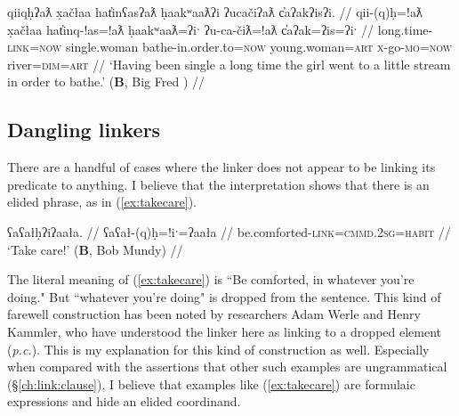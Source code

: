 \ex \label{ex:longtimesingle}
\begingl
\glpreamble qiiqḥʔaƛ x̣ačłaa hat̓inʕasʔaƛ ḥaakʷaaƛʔi ʔucačiʔaƛ c̓aʔakʔisʔi. //
\gla qii-(q)ḥ=!aƛ x̣ačłaa hat̓inq-!as=!aƛ ḥaakʷaaƛ=ʔiˑ ʔu-ca-čiƛ=!aƛ c̓aʔak=ʔis=ʔiˑ //
\glb long.time-\textsc{link}=\textsc{now} single.woman bathe-in.order.to=\textsc{now} young.woman=\textsc{art} \textsc{x}-go-\textsc{mo}=\textsc{now} river=\textsc{dim}=\textsc{art} //
\glft `Having been single a long time the girl went to a little stream in order to bathe.' (\textbf{B}, Big Fred \citealt[p.~68]{sapir1939}) //
\endgl
\xe



\subsection{Dangling linkers} \label{ch:link:dangling}

There are a handful of cases where the linker does not appear to be linking its predicate to anything. I believe that the interpretation shows that there is an elided phrase, as in (\ref{ex:takecare}).

\ex \label{ex:takecare}
\begingl
\glpreamble ʕaʕałḥʔiʔaała. //
\gla ʕaʕał-(q)ḥ=!iˑ=ʔaała //
\glb be.comforted-\textsc{link}=\textsc{cmmd.2sg}=\textsc{habit} //
\glft `Take care!' (\textbf{B}, Bob Mundy) //
\endgl
\xe

The literal meaning of (\ref{ex:takecare}) is ``Be comforted, in whatever you're doing." But ``whatever you're doing" is dropped from the sentence. This kind of farewell construction has been noted by researchers Adam Werle and Henry Kammler, who have understood the linker here as linking to a dropped element (\textit{p.c.}). This is my explanation for this kind of construction as well. Especially when compared with the assertions that other such examples are ungrammatical (\S\ref{ch:link:clause}), I believe that examples like (\ref{ex:takecare}) are formulaic expressions and hide an elided coordinand. %

